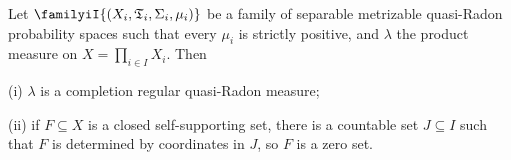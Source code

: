  Let $\familyiI{(X_i,\frak T_i,\Sigma_i,\mu_i)}$
be a family of separable metrizable quasi-Radon probability spaces such
that every $\mu_i$ is strictly positive, and $\lambda$ the product
measure on $X=\prod_{i\in I}X_i$.   Then

(i) $\lambda$ is a completion regular quasi-Radon measure;

(ii) if $F\subseteq X$ is a closed self-supporting set, there is a
countable set $J\subseteq I$ such that $F$ is determined by coordinates
in $J$, so $F$ is a zero set.

